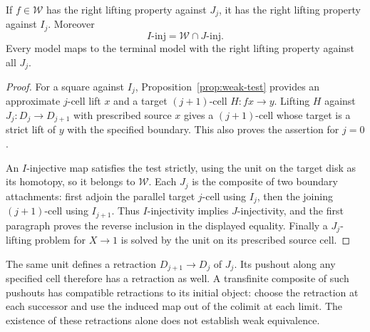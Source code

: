 \begin{lemma}\label{lem:lifting-test}
If $f\in\mathcal W$ has the right lifting property against
$J_j$, it has the right lifting property against $I_j$.
Moreover
\[
 I\text{-}\mathrm{inj}
   =\mathcal W\cap J\text{-}\mathrm{inj}.
\]
Every model maps to the terminal model with the right lifting
property against all $J_j$.
\end{lemma}

\begin{proof}
For a square against $I_j$, Proposition~\ref{prop:weak-test}
provides an approximate $j$-cell lift $x$ and a target
$(j+1)$-cell $H:fx\to y$.  Lifting $H$ against
$J_j:D_j\to D_{j+1}$ with prescribed source $x$ gives a
$(j+1)$-cell whose target is a strict lift of $y$ with the
specified boundary.  This also proves the assertion for
$j=0$.

An $I$-injective map satisfies the test strictly, using the
unit on the target disk as its homotopy, so it belongs to
$\mathcal W$.  Each $J_j$ is the composite of two boundary
attachments: first adjoin the parallel target $j$-cell using
$I_j$, then the joining $(j+1)$-cell using $I_{j+1}$.
Thus $I$-injectivity implies $J$-injectivity, and the first
paragraph proves the reverse inclusion in the displayed
equality.  Finally a $J_j$-lifting problem for $X\to1$
is solved by the unit on its prescribed source cell.
\end{proof}

The same unit defines a retraction $D_{j+1}\to D_j$ of
$J_j$.  Its pushout along any specified cell therefore has
a retraction as well.  A transfinite composite of such
pushouts has compatible retractions to its initial object:
choose the retraction at each successor and use the induced
map out of the colimit at each limit.  The existence of these
retractions alone does not establish weak equivalence.
